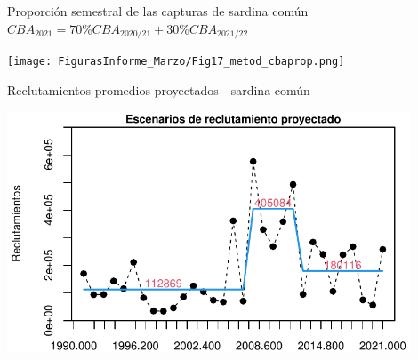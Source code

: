 \documentclass[
  ignorenonframetext,
]{beamer}
\begin{document}
\begin{frame}{Proporción semestral de las capturas de sardina común}
\protect\hypertarget{proporciuxf3n-semestral-de-las-capturas-de-sardina-comuxfan}{}
$CBA_{2021} = 70\%CBA_{2020/21} + 30\%CBA_{2021/22}$

\begin{center}

\texttt{[image: FigurasInforme\_Marzo/Fig17\_metod\_cbaprop.png]}

\end{center}
\end{frame}

\begin{frame}{Reclutamientos promedios proyectados - sardina común}
\protect\hypertarget{reclutamientos-promedios-proyectados---sardina-comuxfan}{}
\begin{center}
\includegraphics[width=0.9\textwidth]{FigurasInforme_Marzo/Fig43_Reclproy_marzo-1.pdf}
\end{center}
\end{frame}
\end{document}
